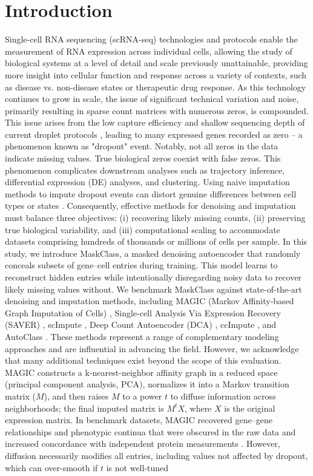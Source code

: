 \documentclass{article}
\theoremstyle{plain}
\theoremstyle{definition}
\theoremstyle{remark}
\begin{document}
\section{Introduction}
Single-cell RNA sequencing (scRNA-seq) technologies and protocols enable the measurement of RNA expression across individual cells, allowing the study of biological systems at a level of detail and scale previously unattainable, providing more insight into cellular function and response across a variety of contexts, such as disease vs. non-disease states or therapeutic drug response. As this technology continues to grow in scale, the issue of significant technical variation and noise, primarily resulting in sparse count matrices with numerous zeros, is compounded. This issue arises from the low capture efficiency and shallow sequencing depth of current droplet protocols \citep{Zheng2017TenX}, leading to many expressed genes recorded as zero -- a phenomenon known as "dropout" event. Notably, not all zeros in the data indicate missing values. True biological zeros coexist with false zeros. This phenomenon complicates downstream analyses such as trajectory inference, differential expression (DE) analyses, and clustering. Using naive imputation methods to impute dropout events can distort genuine differences between cell types or states \citep{Svensson2020NotZI,Jiang2022ZeroInflationReview}. Consequently, effective methods for denoising and imputation must balance three objectives: (i) recovering likely missing counts, (ii) preserving true biological variability, and (iii) computational scaling to accommodate datasets comprising hundreds of thousands or millions of cells per sample. In this study, we introduce MaskClass, a masked denoising autoencoder that randomly conceals subsets of gene–cell entries during training. This model learns to reconstruct hidden entries while intentionally disregarding noisy data to recover likely missing values without. We benchmark MaskClass against state-of-the-art denoising and imputation methods, including MAGIC (Markov Affinity‑based Graph Imputation of Cells) \citep{vanDijk2018MAGIC}, Single-cell Analysis Via Expression Recovery (SAVER) \citep{Huang2018SAVER}, scImpute \citep{Li2018scImpute}, Deep Count Autoencoder (DCA) \citep{Eraslan2019DCA}, ccImpute \citep{Malec2022ccImpute}, and AutoClass \citep{Li2022AutoClass}. These methods represent a range of complementary modeling approaches and are influential in advancing the field. However, we acknowledge that many additional techniques exist beyond the scope of this evaluation. MAGIC constructs a k-nearest-neighbor affinity graph in a reduced space (principal component analysis, PCA), normalizes it into a Markov transition matrix ($M$), and then raises $M$ to a power $t$ to diffuse information across neighborhoods; the final imputed matrix is $M^t X$, where $X$ is the original expression matrix. In benchmark datasets, MAGIC recovered gene–gene relationships and phenotypic continua that were obscured in the raw data and increased concordance with independent protein measurements \citep{Eraslan2019DCA}. However, diffusion necessarily modifies all entries, including values not affected by dropout, which can over-smooth if $t$ is not well-tuned 
\end{document}
